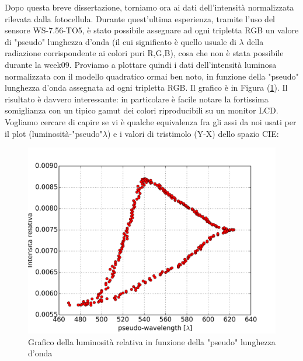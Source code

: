 \documentclass[10pt,letterpaper]{article}
\begin{document}
Dopo questa breve dissertazione, torniamo ora ai dati dell'intensità normalizzata rilevata dalla fotocellula. Durante quest'ultima esperienza, tramite l'uso del sensore \textsc{WS-7.56-TO5}, è stato possibile assegnare ad ogni tripletta RGB un valore di "pseudo" lunghezza d'onda (il cui significato è quello usuale di $\lambda$ della radiazione corrispondente ai colori puri R,G,B), cosa che non è stata possibile durante la week09. Proviamo a plottare quindi i dati dell'intensità luminosa normalizzata con il modello quadratico ormai ben noto, in funzione della "pseudo" lunghezza d'onda assegnata ad ogni tripletta RGB. Il grafico è in Figura (\ref{fig:nostro_gamut}).
Il risultato è davvero interessante: in particolare è facile notare la fortissima somiglianza con un tipico gamut dei colori riproducibili su un monitor LCD. Vogliamo cercare di capire se vi è qualche equivalenza fra gli assi da noi usati per il plot (luminosità-"pseudo"$\lambda$) e i valori di tristimolo (Y-X) dello spazio CIE:

\begin{figure}
\centering
\includegraphics[width=0.7\linewidth]{./nostro_gamut}
\caption{Grafico della luminosità relativa in funzione della "pseudo" lunghezza d'onda}
\label{fig:nostro_gamut}
\end{figure}
\end{document}
